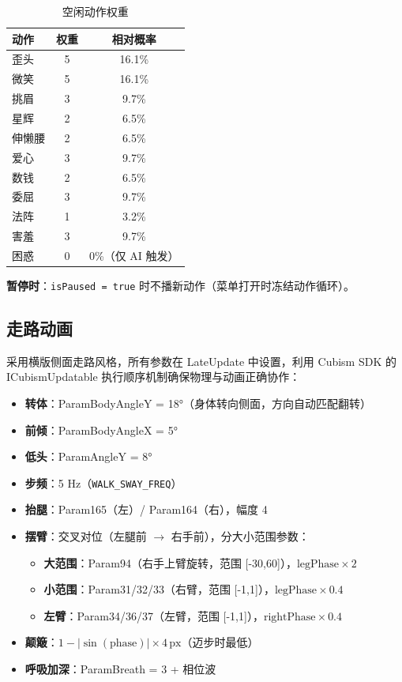 \documentclass[12pt,a4paper]{ctexart}
\begin{document}
\begin{table}[H]
\centering
\caption{空闲动作权重}
\label{tab:idle-weights}
\begin{tabular}{lcc}
\toprule
\textbf{动作} & \textbf{权重} & \textbf{相对概率} \\
\midrule
歪头   & 5 & 16.1\% \\
微笑   & 5 & 16.1\% \\
挑眉   & 3 & 9.7\% \\
星辉   & 2 & 6.5\% \\
伸懒腰 & 2 & 6.5\% \\
爱心   & 3 & 9.7\% \\
数钱   & 2 & 6.5\% \\
委屈   & 3 & 9.7\% \\
法阵   & 1 & 3.2\% \\
害羞   & 3 & 9.7\% \\
困惑   & 0 & 0\%（仅 AI 触发） \\
\bottomrule
\end{tabular}
\end{table}

\textbf{暂停时}：\texttt{isPaused = true} 时不播新动作（菜单打开时冻结动作循环）。

\subsection{走路动画}

采用横版侧面走路风格，所有参数在 LateUpdate 中设置，利用 Cubism SDK 的 ICubismUpdatable 执行顺序机制确保物理与动画正确协作：

\begin{itemize}
    \item \textbf{转体}：ParamBodyAngleY = 18°（身体转向侧面，方向自动匹配翻转）
    \item \textbf{前倾}：ParamBodyAngleX = 5°
    \item \textbf{低头}：ParamAngleY = 8°
    \item \textbf{步频}：5 Hz（\texttt{WALK\_SWAY\_FREQ}）
    \item \textbf{抬腿}：Param165（左）/ Param164（右），幅度 4
    \item \textbf{摆臂}：交叉对位（左腿前 $\to$ 右手前），分大小范围参数：
        \begin{itemize}
            \item \textbf{大范围}：Param94（右手上臂旋转，范围 [-30,60]），$\text{legPhase}\times 2$
            \item \textbf{小范围}：Param31/32/33（右臂，范围 [-1,1]），$\text{legPhase}\times 0.4$
            \item \textbf{左臂}：Param34/36/37（左臂，范围 [-1,1]），$\text{rightPhase}\times 0.4$
        \end{itemize}
    \item \textbf{颠簸}：$1 - |\sin(\text{phase})|\times 4\,\text{px}$（迈步时最低）
    \item \textbf{呼吸加深}：ParamBreath = 3 + 相位波
\end{itemize}
\end{document}
